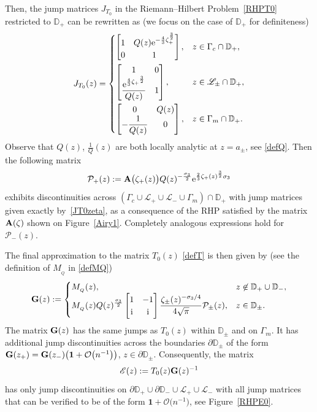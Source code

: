 \documentclass[pdftex]{sigma}
\numberwithin{equation}{section}
\theoremstyle{definition}
\def \scr{\mathscr}
\def \DD{\mathbb D}
\def \ds{\displaystyle}
\def\be{\begin{equation}}
\def\ee{\end{equation}}
\def \1{\mathbf 1}
\def\s{\sigma}
\def\pa{\partial}
\def\la{\label}
\begin{document}
Then, the jump matrices $J_{T_0}$ in the Riemann--Hilbert Problem~\ref{RHPT0} restricted to $\DD_+$ can be rewritten as (we focus on the case of $\DD_+$ for definiteness)
\begin{gather}
\label{JT0zeta}
J_{T_0}(z) =
\begin{cases}
\begin{bmatrix}
1 & Q(z) {\rm e}^{-\frac 43\zeta_+^\frac 32}\\
0& 1
\end{bmatrix},
 & z\in \Gamma_c\cap \DD_+,\vspace{1mm}\\
 \begin{bmatrix}
1 & 0 \\
\displaystyle \frac{\ds {\rm e}^{\frac 43{\zeta_+}^\frac 32} }{Q(z)} & 1
\end{bmatrix},
& z\in \scr L_\pm \cap \DD_+,
\vspace{1mm}\\
\begin{bmatrix}
 0 & Q(z) \\
\displaystyle -\frac 1 {Q(z)} & 0
\end{bmatrix},
 & z\in \Gamma_m\cap \DD_+.
\end{cases}
\end{gather}
Observe that $Q(z)$, $\frac 1 Q(z)$ are both locally analytic at $z=a_\pm$, see \eqref{defQ}.
Then the following matrix
\[
\mathcal P_+(z) := {\bf A} \bigl(\zeta_+(z)\bigr) Q(z)^{-\frac {\s_3}2} {\rm e}^{\frac 2 3\zeta_+(z)^\frac 32 \s_3}
\]
exhibits discontinuities across $(\Gamma_c\cup\scr L_+\cup \scr L_- \cup \Gamma_m)\cap \DD_+$ with jump matrices given exactly by~\eqref{JT0zeta}, as a consequence of the RHP satisfied by the matrix
${\bf A}(\zeta)$ shown on Figure~\ref{Airy1}. Completely analogous expressions hold for $\mathcal P_-(z)$.


The final approximation to the matrix $T_0(z)$ \eqref{defT} is then given by (see the definition of $M_{_Q}$ in \eqref{defMQ})
\[
{\bf G}(z):=
\begin{cases}
M_{_Q}(z), & z\not\in \DD_+\cup \DD_-,
\\
\displaystyle M_{_Q}(z) Q(z)^{\frac {\s_3}2} \begin{bmatrix}
1 & -1\\
{\rm i} & {\rm i} \\
\end{bmatrix}\frac{\ds \zeta_\pm(z)^{-\sigma_3/4}}{4\sqrt{\pi}} \mathcal P_\pm (z),& z\in \DD_\pm.
\end{cases}
\]
The matrix ${\bf G}(z)$ has the same jumps as $T_0(z)$ within $\DD_\pm$ and on $\Gamma_m$. It has additional jump discontinuities across the boundaries $\pa\DD_\pm$ of the form
$
{\bf G} (z_+)= {\bf G} (z_-)\bigl(\1 + \mathcal O\bigl(n^{-1}\bigr) \bigr)$, $z\in \pa\DD_\pm$.
Consequently, the matrix
\be
\scr E(z):= T_0(z) {\bf G}(z)^{-1}\la{errormatrix}
\ee
has only jump discontinuities on $\pa\DD_+\cup \pa \DD_- \cup \scr L_+\cup \scr L_-$ with all jump matrices that can be verified to be of the form $\1 + \mathcal O\bigl(n^{-1}\bigr)$, see Figure~\ref{RHPE0}.
\end{document}
